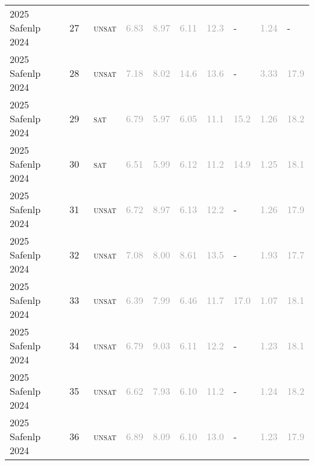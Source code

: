 \begin{center}
{\begin{longtable}{@{}llllllllll@{}}
2025 Safenlp 2024 & 27 & ~\textsc{unsat} & \textcolor{darkgray}{6.83} & \textcolor{darkgray}{8.97} & \textcolor{darkgray}{6.11} & \textcolor{darkgray}{12.3} & - & \textcolor{darkgray}{1.24} & - \\
2025 Safenlp 2024 & 28 & ~\textsc{unsat} & \textcolor{darkgray}{7.18} & \textcolor{darkgray}{8.02} & \textcolor{darkgray}{14.6} & \textcolor{darkgray}{13.6} & - & \textcolor{darkgray}{3.33} & \textcolor{darkgray}{17.9} \\
2025 Safenlp 2024 & 29 & ~\textsc{sat} & \textcolor{darkgray}{6.79} & \textcolor{darkgray}{5.97} & \textcolor{darkgray}{6.05} & \textcolor{darkgray}{11.1} & \textcolor{darkgray}{15.2} & \textcolor{darkgray}{1.26} & \textcolor{darkgray}{18.2} \\
2025 Safenlp 2024 & 30 & ~\textsc{sat} & \textcolor{darkgray}{6.51} & \textcolor{darkgray}{5.99} & \textcolor{darkgray}{6.12} & \textcolor{darkgray}{11.2} & \textcolor{darkgray}{14.9} & \textcolor{darkgray}{1.25} & \textcolor{darkgray}{18.1} \\
2025 Safenlp 2024 & 31 & ~\textsc{unsat} & \textcolor{darkgray}{6.72} & \textcolor{darkgray}{8.97} & \textcolor{darkgray}{6.13} & \textcolor{darkgray}{12.2} & - & \textcolor{darkgray}{1.26} & \textcolor{darkgray}{17.9} \\
2025 Safenlp 2024 & 32 & ~\textsc{unsat} & \textcolor{darkgray}{7.08} & \textcolor{darkgray}{8.00} & \textcolor{darkgray}{8.61} & \textcolor{darkgray}{13.5} & - & \textcolor{darkgray}{1.93} & \textcolor{darkgray}{17.7} \\
2025 Safenlp 2024 & 33 & ~\textsc{unsat} & \textcolor{darkgray}{6.39} & \textcolor{darkgray}{7.99} & \textcolor{darkgray}{6.46} & \textcolor{darkgray}{11.7} & \textcolor{darkgray}{17.0} & \textcolor{darkgray}{1.07} & \textcolor{darkgray}{18.1} \\
2025 Safenlp 2024 & 34 & ~\textsc{unsat} & \textcolor{darkgray}{6.79} & \textcolor{darkgray}{9.03} & \textcolor{darkgray}{6.11} & \textcolor{darkgray}{12.2} & - & \textcolor{darkgray}{1.23} & \textcolor{darkgray}{18.1} \\
2025 Safenlp 2024 & 35 & ~\textsc{unsat} & \textcolor{darkgray}{6.62} & \textcolor{darkgray}{7.93} & \textcolor{darkgray}{6.10} & \textcolor{darkgray}{11.2} & - & \textcolor{darkgray}{1.24} & \textcolor{darkgray}{18.2} \\
2025 Safenlp 2024 & 36 & ~\textsc{unsat} & \textcolor{darkgray}{6.89} & \textcolor{darkgray}{8.09} & \textcolor{darkgray}{6.10} & \textcolor{darkgray}{13.0} & - & \textcolor{darkgray}{1.23} & \textcolor{darkgray}{17.9} \\

\end{longtable}}
\end{center}
